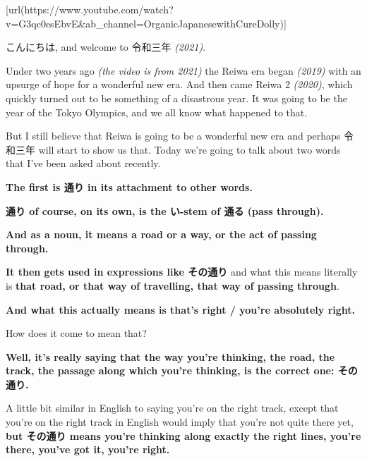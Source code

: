 \startsectionlevel[title={{\bf 96. 通り and せっかく: A metaphorical road and an untranslatable word.}},reference={通り-and-せっかく-a-metaphorical-road-and-an-untranslatable-word.}]

[url(https://www.youtube.com/watch?v=G3qc0esEbvE&ab_channel=OrganicJapanesewithCureDolly)]

こんにちは, and welcome to 令和三年 {\em (2021)}.

Under two years ago {\em (the video is from 2021)} the Reiwa era began {\em (2019)} with an upsurge of hope for a wonderful new era. And then came Reiwa 2 {\em (2020)}, which quickly turned out to be something of a disastrous year. It was going to be the year of the Tokyo Olympics, and we all know what happened to that.

But I still believe that Reiwa is going to be a wonderful new era and perhaps 令和三年 will start to show us that. Today we're going to talk about two words that I've been asked about recently.

\startsectionlevel[title={通り},reference={通り}]

{\bf The first is 通り in its attachment to other words.}

{}

{\bf 通り of course, on its own, is the い-stem of 通る (pass through).}

{\bf And as a noun, it means a road or a way, or the act of passing through.}

\startsectionlevel[title={その通り},reference={その通り}]

{\bf It then gets used in expressions like その通り} and what this means literally is {\bf that road, or that way of travelling, that way of passing through}.

{\bf And what this actually means is that's right / you're absolutely right.}

{}

How does it come to mean that?

{\bf Well, it's really saying that the way you're thinking, the road, the track, the passage along which you're thinking, is the correct one: その通り.}

A little bit similar in English to saying you're on the right track, except that you're on the right track in English would imply that you're not quite there yet, {\bf but その通り means you're thinking along exactly the right lines, you're there, you've got it, you're right.}

